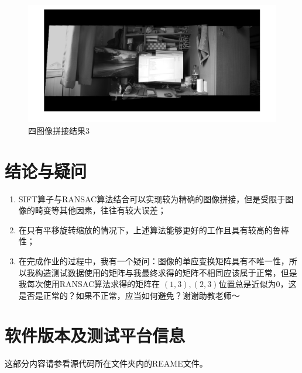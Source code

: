 \documentclass[a4paper, UTF8]{ctexrep}
\begin{document}
		\begin{figure}[htbp!]
			\centering
			\includegraphics[width = \textwidth]{hw2_fig8.png}
			\caption{四图像拼接结果3}
			\label{fig:figure1}
		\end{figure}
		
	\section{结论与疑问}
	\begin{enumerate}
		\item SIFT算子与RANSAC算法结合可以实现较为精确的图像拼接，但是受限于图像的畸变等其他因素，往往有较大误差；
		\item 在只有平移旋转缩放的情况下，上述算法能够更好的工作且具有较高的鲁棒性；
		\item 在完成作业的过程中，我有一个疑问：图像的单应变换矩阵具有不唯一性，所以我构造测试数据使用的矩阵与我最终求得的矩阵不相同应该属于正常，但是我每次使用RANSAC算法求得的矩阵在 $\left(1, 3\right), \left(2, 3\right)$位置总是近似为0，这是否是正常的？如果不正常，应当如何避免？谢谢助教老师～
	\end{enumerate}

  \section{软件版本及测试平台信息}
    这部分内容请参看源代码所在文件夹内的REAME文件。
\end{document}
